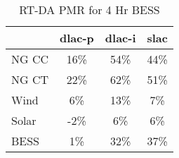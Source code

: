 \begin{table}[htbp]
\centering
\begin{tabular}{lccc}
\toprule
\hline
 & dlac-p & dlac-i & slac \\
\hline
\quad NG CC & 16\% & 54\% & 44\% \\
\quad NG CT & 22\% & 62\% & 51\% \\
\quad Wind & 6\% & 13\% & 7\% \\
\quad Solar & -2\% & 6\% & 6\% \\
\quad BESS & 1\% & 32\% & 37\% \\
\hline
\bottomrule
\end{tabular}
\caption{RT-DA PMR for 4 Hr BESS}
\label{tab:table4_4_Hr_BESS}
\end{table}
